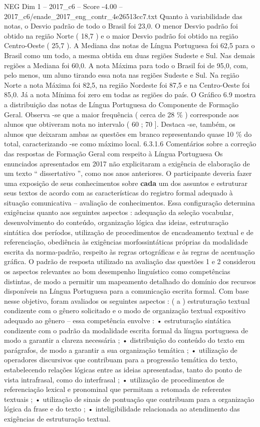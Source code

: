 \begin{textsample}{NEG Dim 1 – 2017\_c6 – Score -4.00 – 2017\_c6/enade\_2017\_eng\_contr\_4e26513cc7.txt}
Quanto à variabilidade das notas, o Desvio padrão de todo o Brasil foi 23,0.
O menor Desvio padrão foi obtido na região Norte ( 18,7 ) e o maior Desvio padrão foi obtido na região Centro-Oeste ( 25,7 ).
A Mediana das notas de Língua Portuguesa foi 62,5 para o Brasil como um todo, a mesma obtida em duas regiões Sudeste e Sul.
Nas demais regiões a Mediana foi 60,0.
A nota Máxima para todo o Brasil foi de 95,0, com, pelo menos, um aluno tirando essa nota nas regiões Sudeste e Sul.
Na região Norte a nota Máxima foi 82,5, na região Nordeste foi 87,5 e na Centro-Oeste foi 85,0.
Já a nota Mínima foi zero em todas as regiões do país.
O Gráfico 6.9 mostra a distribuição das notas de Língua Portuguesa do Componente de Formação Geral.
Observa -se que a maior frequência ( cerca de 28 \% ) corresponde aos alunos que obtiveram nota no intervalo ( 60 ; 70 ].
Destaca -se, também, os alunos que deixaram ambas as questões em branco representando quase 10 \% do total, caracterizando -se como máximo local. 6.3.1.6 Comentários sobre a correção das respostas de Formação Geral com respeito à Língua Portuguesa Os enunciados apresentados em 2017 não explicitaram a exigência de elaboração de um texto “ dissertativo ”, como nos anos anteriores.
O participante deveria fazer uma exposição de seus conhecimentos sobre \textbf{cada} um dos assuntos e estruturar seus textos de acordo com as características do registro formal adequado à situação comunicativa – avaliação de conhecimentos.
Essa configuração determina exigências quanto aos seguintes aspectos : adequação da seleção vocabular, desenvolvimento do conteúdo, organização lógica das ideias, estruturação sintática dos períodos, utilização de procedimentos de encadeamento textual e de referenciação, obediência às exigências morfossintáticas próprias da modalidade escrita da norma-padrão, respeito às regras ortográficas e às regras de acentuação gráfica.
O padrão de resposta utilizado na avaliação das questões 1 e 2 considerou os aspectos relevantes ao bom desempenho linguístico como competências distintas, de modo a permitir um mapeamento detalhado do domínio dos recursos disponíveis na Língua Portuguesa para a comunicação escrita formal.
Com base nesse objetivo, foram avaliados os seguintes aspectos : ( a ) estruturação textual condizente com o gênero solicitado e o modo de organização textual expositivo adequado ao gênero – essa competência envolve : • estruturação sintática condizente com o padrão da modalidade escrita formal da língua portuguesa de modo a garantir a clareza necessária ; • distribuição do conteúdo do texto em parágrafos, de modo a garantir a sua organização temática ; • utilização de operadores discursivos que contribuam para a progressão temática do texto, estabelecendo relações lógicas entre as ideias apresentadas, tanto do ponto de vista intrafrasal, como do interfrasal ; • utilização de procedimentos de referenciação lexical e pronominal que permitam a retomada de referentes textuais ; • utilização de sinais de pontuação que contribuam para a organização lógica da frase e do texto ; • inteligibilidade relacionada ao atendimento das exigências de estruturação textual.

\end{textsample}
